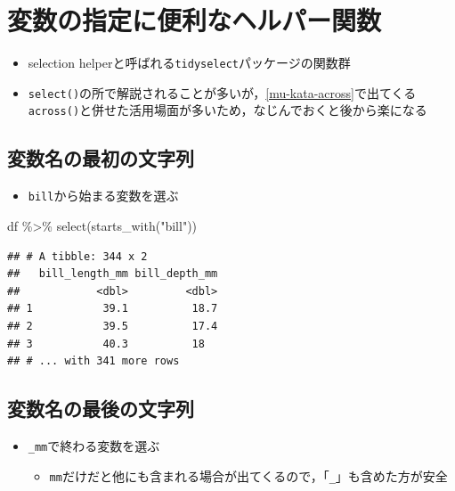\documentclass[
  xelatex,ja=standard, b5paper]{bxjsbook}
\newenvironment{Shaded}{\begin{snugshade}}{\end{snugshade}}
\newcommand{\FunctionTok}[1]{\textcolor[rgb]{0.00,0.00,0.00}{#1}}
\newcommand{\NormalTok}[1]{#1}
\newcommand{\SpecialCharTok}[1]{\textcolor[rgb]{0.00,0.00,0.00}{#1}}
\newcommand{\StringTok}[1]{\textcolor[rgb]{0.31,0.60,0.02}{#1}}
\providecommand{\tightlist}{%
  \setlength{\itemsep}{0pt}\setlength{\parskip}{0pt}}
\begin{document}
\hypertarget{select-helper}{%
\section{変数の指定に便利なヘルパー関数}\label{select-helper}}

\begin{itemize}
\tightlist
\item
  selection helperと呼ばれる\texttt{tidyselect}パッケージの関数群
\item
  \texttt{select()}の所で解説されることが多いが，\ref{mu-kata-across}で出てくる\texttt{across()}と併せた活用場面が多いため，なじんでおくと後から楽になる
\end{itemize}

\hypertarget{select-helper1}{%
\subsection{変数名の最初の文字列}\label{select-helper1}}

\begin{itemize}
\tightlist
\item
  \texttt{bill}から始まる変数を選ぶ
\end{itemize}

\begin{Shaded}
\begin{Highlighting}[]
\NormalTok{df }\SpecialCharTok{\%\textgreater{}\%}
  \FunctionTok{select}\NormalTok{(}\FunctionTok{starts\_with}\NormalTok{(}\StringTok{"bill"}\NormalTok{))}
\end{Highlighting}
\end{Shaded}

\begin{verbatim}
## # A tibble: 344 x 2
##   bill_length_mm bill_depth_mm
##            <dbl>         <dbl>
## 1           39.1          18.7
## 2           39.5          17.4
## 3           40.3          18  
## # ... with 341 more rows
\end{verbatim}

\hypertarget{select-helper2}{%
\subsection{変数名の最後の文字列}\label{select-helper2}}

\begin{itemize}
\tightlist
\item
  \texttt{\_mm}で終わる変数を選ぶ

  \begin{itemize}
  \tightlist
  \item
    \texttt{mm}だけだと他にも含まれる場合が出てくるので，「\texttt{\_}」も含めた方が安全
  \end{itemize}
\end{itemize}
\end{document}
